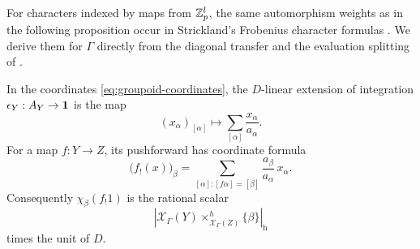 For characters indexed by maps from $\mathbb Z_p^l$, the same automorphism weights
as in the following proposition occur in Strickland's Frobenius character
formulas \cite[Section~10 and Theorem~10.2]{StricklandDuality}.
We derive them for $\Gamma$ directly from the diagonal transfer and the
evaluation splitting of .

\begin{proposition}\label{prop:relative-weights}
In the coordinates \eqref{eq:groupoid-coordinates}, the $D$-linear
extension of integration $\epsilon_Y:A_Y\to\mathbf1$ is the map
\begin{equation}\label{eq:absolute-weights}
 (x_\alpha)_{[\alpha]}\longmapsto
       \sum_{[\alpha]}\frac{x_\alpha}{a_\alpha}.
\end{equation}
For a map $f:Y\to Z$, its pushforward has coordinate formula
\begin{equation}\label{eq:relative-weights}
 \bigl(f_!(x)\bigr)_\beta
   =\sum_{[\alpha]:[f\alpha]=[\beta]}
       \frac{a_\beta}{a_\alpha}\,x_\alpha.
\end{equation}
Consequently $\chi_\beta(f_!1)$ is the rational scalar
\begin{equation}\label{eq:relative-fiber-mass}
 \left|
   \mathcal X_\Gamma(Y)
       \mathop{\times}^{h}_{\mathcal X_\Gamma(Z)}\{\beta\}
 \right|_{\mathrm h}
\end{equation}
times the unit of $D$.
\end{proposition}


